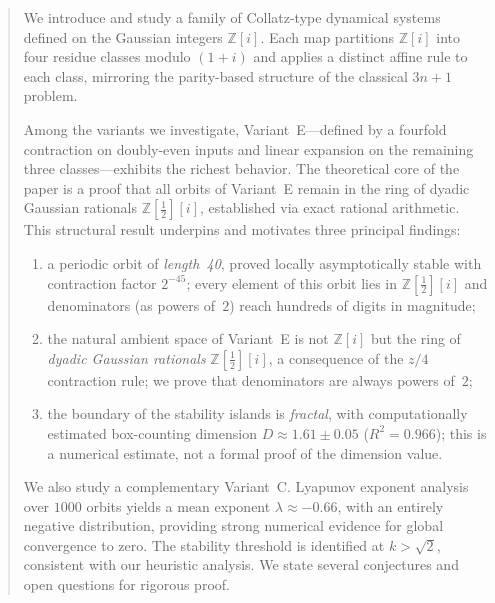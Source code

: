 \documentclass[12pt]{article}
\theoremstyle{plain}
\theoremstyle{definition}
\theoremstyle{remark}
\theoremstyle{definition}
\newcommand{\Z}{\mathbb{Z}}
\newcommand{\Zi}{\mathbb{Z}[i]}
\begin{document}
\begin{abstract}
We introduce and study a family of Collatz-type dynamical systems
defined on the Gaussian integers $\Zi$.
Each map partitions $\Zi$ into four residue classes modulo $(1+i)$
and applies a distinct affine rule to each class, mirroring the
parity-based structure of the classical $3n+1$ problem.

Among the variants we investigate, Variant~E---defined by a
fourfold contraction on doubly-even inputs and linear expansion
on the remaining three classes---exhibits the richest behavior.
The theoretical core of the paper is a proof that all orbits of
Variant~E remain in the ring of dyadic Gaussian rationals
$\Z[\tfrac{1}{2}][i]$, established via exact rational arithmetic.
This structural result underpins and motivates three principal findings:
\begin{enumerate}[label=(\roman*)]
    \item a periodic orbit of \emph{length~40}, proved
          locally asymptotically stable with contraction factor $2^{-45}$;
          every element of this orbit lies in
          $\Z[\tfrac{1}{2}][i]$ and denominators (as powers of~$2$)
          reach hundreds of digits in magnitude;
    \item the natural ambient space of Variant~E is not $\Zi$ but
          the ring of \emph{dyadic Gaussian rationals}
          $\Z[\tfrac{1}{2}][i]$, a consequence of the $z/4$
          contraction rule; we prove that denominators are always
          powers of~$2$;
    \item the boundary of the stability islands is \emph{fractal},
          with computationally estimated box-counting dimension
          $D \approx 1.61 \pm 0.05$ ($R^2 = 0.966$); this is a
          numerical estimate, not a formal proof of the dimension value.
\end{enumerate}
We also study a complementary Variant~C. Lyapunov exponent
analysis over $1000$ orbits yields a mean exponent
$\lambda \approx -0.66$, with an entirely negative distribution,
providing strong numerical evidence for global convergence to zero.
The stability threshold is identified at $k > \sqrt{2}$, consistent
with our heuristic analysis.
We state several conjectures and open questions for rigorous proof.
\end{abstract}

\tableofcontents

\end{document}
